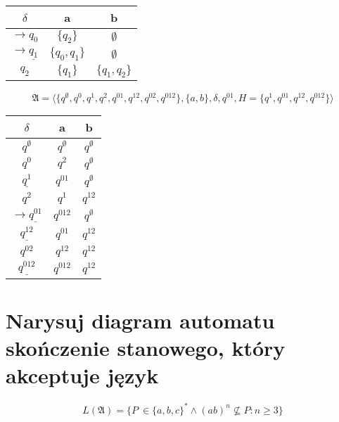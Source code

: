 \documentclass{../notatki}
\begin{document}
\divider

\begin{table}[h!]
  \centering
  \begin{tabular}{c|c|c}
    $\delta$                      & a              & b \\ \hline
    $\rightarrow q_0$             & $\{q_2\}$      & $\emptyset$ \\ \hline
    $\rightarrow \underline{q_1}$ & $\{q_0, q_1\}$ & $\emptyset$\\ \hline
    $q_2$                         & $\{q_1\}$      & $\{q_1, q_2\}$ \\
  \end{tabular}
\end{table}

$$
\mathfrak{A} = \langle \{q^\emptyset, q^0, q^1, q^2, q^{01}, q^{12},
q^{02}, q^{012}\},\{a, b\},\delta,q^{01},H = \{q^1, q^{01}, q^{12},
q^{012}\} \rangle
$$

\begin{table}[h!]
  \centering
  \begin{tabular}{c|c|c}
    $\delta$                       & a              & b \\ \hline
    $q^\emptyset$                  & $q^\emptyset$  & $q^\emptyset$ \\ \hline
    $q^0$                          & $q^2$          & $q^\emptyset$ \\ \hline
    $\underline{q^1}$              & $q^{01}$       & $q^\emptyset$ \\ \hline
    $q^2$                          & $q^1$          & $q^{12}$ \\ \hline
    $\rightarrow\underline{q^{01}}$& $q^{012}$      & $q^\emptyset$ \\ \hline
    $\underline{q^{12}}$           & $q^{01}$       & $q^{12}$ \\ \hline
    $q^{02}$                       & $q^{12}$       & $q^{12}$ \\ \hline
    $\underline{q^{012}}$          & $q^{012}$      & $q^{12}$ \\
  \end{tabular}
\end{table}

\section{Narysuj diagram automatu skończenie stanowego, który
akceptuje język}

$$
L(\mathfrak{A}) = \{P\ \in \{a, b, c\}^* \wedge (ab)^n \nsubseteq P
: n \ge 3\}
$$
\end{document}
